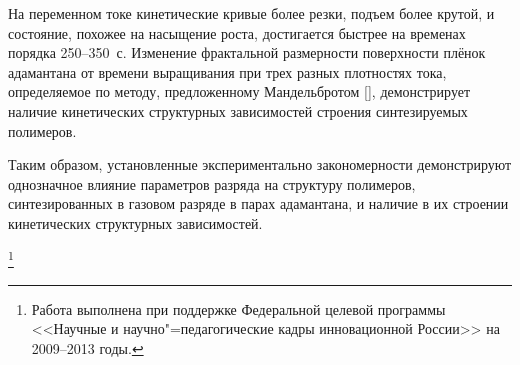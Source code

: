 На переменном токе кинетические кривые более резки, подъем более
крутой, и состояние, похожее на насыщение роста, достигается
быстрее на временах порядка 250--350~с. Изменение фрактальной
размерности поверхности плёнок адамантана от времени выращивания
при трех разных плотностях тока, определяемое по методу, предложенному
Мандельбротом [], демонстрирует
наличие кинетических структурных зависимостей строения
синтезируемых полимеров.

Таким образом, установленные экспериментально закономерности
демонстрируют однозначное влияние параметров разряда на структуру
полимеров, синтезированных в газовом разряде в парах адамантана, и
наличие в их строении кинетических структурных зависимостей.


\thanks{Работа выполнена при поддержке Федеральной целевой
программы <<Научные и научно"=педагогические кадры инновационной
России>> на 2009--2013 годы.}


